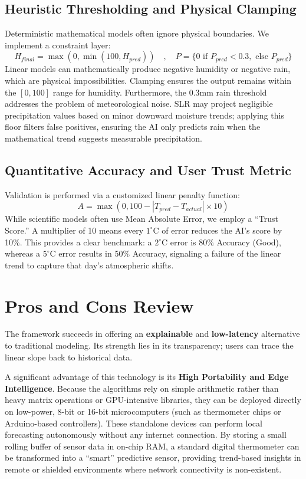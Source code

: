 \documentclass[14pt]{extarticle}
\begin{document}
\subsection{Heuristic Thresholding and Physical Clamping}
Deterministic mathematical models often ignore physical boundaries. We implement a constraint layer:
\begin{equation}
H_{final} = \max(0, \min(100, H_{pred})) \quad , \quad P = \{0 \text{ if } P_{pred} < 0.3, \text{ else } P_{pred}\}
\end{equation}
Linear models can mathematically produce negative humidity or negative rain, which are physical impossibilities. Clamping ensures the output remains within the $[0, 100]$ range for humidity. Furthermore, the 0.3mm rain threshold addresses the problem of meteorological noise. SLR may project negligible precipitation values based on minor downward moisture trends; applying this floor filters false positives, ensuring the AI only predicts rain when the mathematical trend suggests measurable precipitation.

\subsection{Quantitative Accuracy and User Trust Metric}
Validation is performed via a customized linear penalty function:
\begin{equation}
A = \max(0, 100 - |T_{pred} - T_{actual}| \times 10)
\end{equation}
While scientific models often use Mean Absolute Error, we employ a ``Trust Score.'' A multiplier of 10 means every $1^\circ\text{C}$ of error reduces the AI's score by 10\%. This provides a clear benchmark: a $2^\circ\text{C}$ error is 80\% Accuracy (Good), whereas a $5^\circ\text{C}$ error results in 50\% Accuracy, signaling a failure of the linear trend to capture that day's atmospheric shifts.

\section{Pros and Cons Review}
The framework succeeds in offering an \textbf{explainable} and \textbf{low-latency} alternative to traditional modeling. Its strength lies in its transparency; users can trace the linear slope back to historical data. 

A significant advantage of this technology is its \textbf{High Portability and Edge Intelligence}. Because the algorithms rely on simple arithmetic rather than heavy matrix operations or GPU-intensive libraries, they can be deployed directly on low-power, 8-bit or 16-bit microcomputers (such as thermometer chips or Arduino-based controllers). These standalone devices can perform local forecasting autonomously without any internet connection. By storing a small rolling buffer of sensor data in on-chip RAM, a standard digital thermometer can be transformed into a ``smart'' predictive sensor, providing trend-based insights in remote or shielded environments where network connectivity is non-existent.
\end{document}
